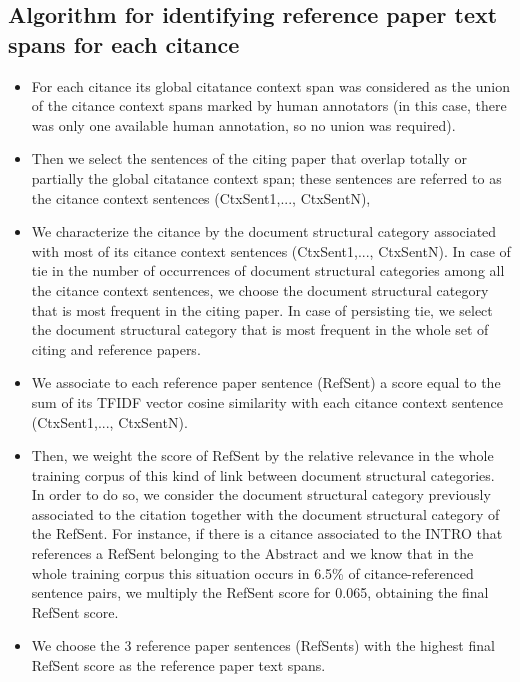 \documentclass[11pt]{article}
\begin{document}
\subsection{ Algorithm for identifying reference paper text spans 
				for each citance}
\begin{itemize}
\item{For each citance its global citatance context span was considered as the union 
of the citance context spans} marked by human annotators (in this case, there 
was only one available human annotation, so no union was required).
\item{Then we select the sentences of the citing paper} that overlap totally 
or partially the global citatance context span; these sentences are referred 
to as the citance context sentences (CtxSent1,..., CtxSentN),
\item{We characterize the citance by the document structural category 
associated with most of its citance context sentences 
(CtxSent1,..., CtxSentN)}. In case of tie in the number of occurrences of 
document structural categories among all the citance context sentences, we 
choose the document structural category that is most frequent in the citing 
paper. In case of persisting tie, we select the document structural category 
that is most frequent in the whole set of citing and reference papers.
\item{We associate to each reference paper sentence (RefSent) a score} equal 
to the sum of its TFIDF vector cosine similarity with each citance context 
sentence (CtxSent1,..., CtxSentN).
\item{Then, we weight the score of RefSent by the relative relevance in the 
whole training corpus} of this kind of link between document structural 
categories. In order to do so, we consider the document structural category 
previously associated to the citation together with the document structural 
category of the RefSent. For instance, if there is a citance associated to the 
INTRO that references a RefSent belonging to the Abstract and we know that in 
the whole training corpus this situation occurs in 6.5\% of citance-referenced 
sentence pairs, we multiply the RefSent score for 0.065, obtaining the final 
RefSent score.
\item{We choose the 3 reference paper sentences} (RefSents) with the highest 
final RefSent score as the reference paper text spans.
\end{itemize}
\end{document}
